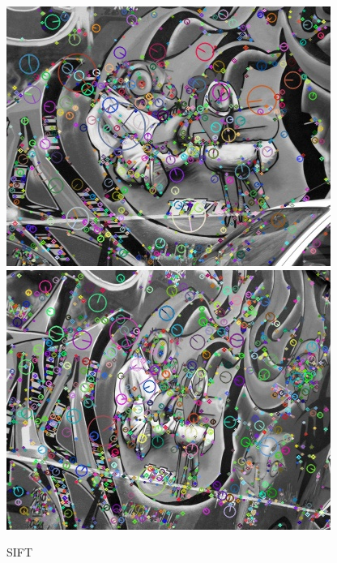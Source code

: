 		\begin{figure}[!htb]
				\includegraphics[width=\linewidth]{images/experiments/KP_SIFT_0}
				\label{fig:awesome_image1}
			\endminipage\hfill
				\includegraphics[width=\linewidth]{images/experiments/KP_SIFT_1}
				\label{fig:awesome_image2}
			\endminipage
			\caption{SIFT}
		\end{figure}
